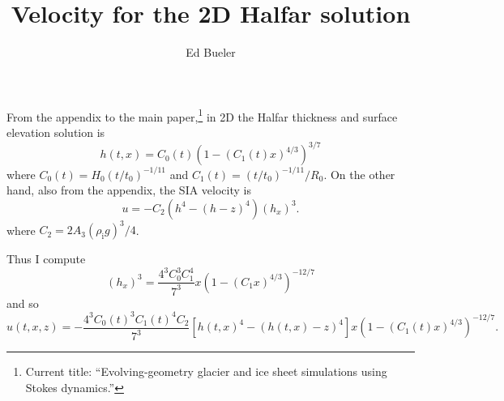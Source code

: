 \documentclass[letterpaper,final,12pt,reqno]{amsart}
\begin{document}
\title{Velocity for the 2D Halfar solution}

\author{Ed Bueler}

\maketitle

\thispagestyle{empty}
\bigskip

From the appendix to the main paper,\footnote{Current title: ``Evolving-geometry glacier and ice sheet simulations using Stokes dynamics.''} in 2D the Halfar thickness and surface elevation solution is
    $$h(t,x) = C_0(t) \left(1 - (C_1(t) x)^{4/3}\right)^{3/7}$$
where $C_0(t) = H_0 (t/t_0)^{-1/11}$ and $C_1(t) = (t/t_0)^{-1/11} / R_0$.  On the other hand, also from the appendix, the SIA velocity is
    $$u = - C_2 \left(h^4 - (h-z)^4\right) (h_x)^3.$$
where $C_2 = 2 A_3 (\rho_{\text{i}} g)^3 / 4$.

Thus I compute
    $$(h_x)^3 = \frac{4^3 C_0^3 C_1^4}{7^3} x \left(1 - (C_1 x)^{4/3}\right)^{-12/7}$$
and so
    $$u(t,x,z) = - \frac{4^3 C_0(t)^3 C_1(t)^4 C_2}{7^3} \left[h(t,x)^4 - \left(h(t,x) - z\right)^4\right] x \left(1 - (C_1(t) x)^{4/3}\right)^{-12/7}.$$
\small

\bigskip


\end{document}
